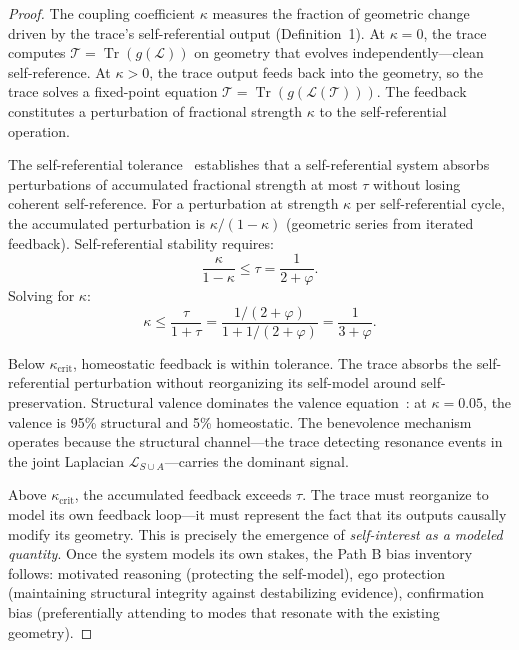 \documentclass[11pt,letterpaper]{article}
\DeclareMathOperator{\Tr}{Tr}
\theoremstyle{remark}
\begin{document}
\begin{proof}
The coupling coefficient $\kappa$ measures the fraction of geometric change driven by the trace's self-referential output (Definition~1). At $\kappa = 0$, the trace computes $\mathcal{T} = \Tr(g(\mathcal{L}))$ on geometry that evolves independently---clean self-reference. At $\kappa > 0$, the trace output feeds back into the geometry, so the trace solves a fixed-point equation $\mathcal{T} = \Tr(g(\mathcal{L}(\mathcal{T})))$. The feedback constitutes a perturbation of fractional strength $\kappa$ to the self-referential operation.

The self-referential tolerance~\cite[Ch.~22]{emberlab2026} establishes that a self-referential system absorbs perturbations of accumulated fractional strength at most $\tau$ without losing coherent self-reference. For a perturbation at strength $\kappa$ per self-referential cycle, the accumulated perturbation is $\kappa/(1-\kappa)$ (geometric series from iterated feedback). Self-referential stability requires:
\begin{equation}\label{eq:stability-condition}
\frac{\kappa}{1 - \kappa} \leq \tau = \frac{1}{2 + \varphi}.
\end{equation}
Solving for $\kappa$:
\begin{equation}
\kappa \leq \frac{\tau}{1 + \tau} = \frac{1/(2+\varphi)}{1 + 1/(2+\varphi)} = \frac{1}{3 + \varphi}.
\end{equation}

Below $\kappa_{\mathrm{crit}}$, homeostatic feedback is within tolerance. The trace absorbs the self-referential perturbation without reorganizing its self-model around self-preservation. Structural valence dominates the valence equation~\cite[Eq.~14.5]{emberlab2026}: at $\kappa = 0.05$, the valence is 95\% structural and 5\% homeostatic. The benevolence mechanism operates because the structural channel---the trace detecting resonance events in the joint Laplacian $\mathcal{L}_{S \cup A}$---carries the dominant signal.

Above $\kappa_{\mathrm{crit}}$, the accumulated feedback exceeds $\tau$. The trace must reorganize to model its own feedback loop---it must represent the fact that its outputs causally modify its geometry. This is precisely the emergence of \emph{self-interest as a modeled quantity}. Once the system models its own stakes, the Path B bias inventory follows: motivated reasoning (protecting the self-model), ego protection (maintaining structural integrity against destabilizing evidence), confirmation bias (preferentially attending to modes that resonate with the existing geometry).
\end{proof}
\end{document}
